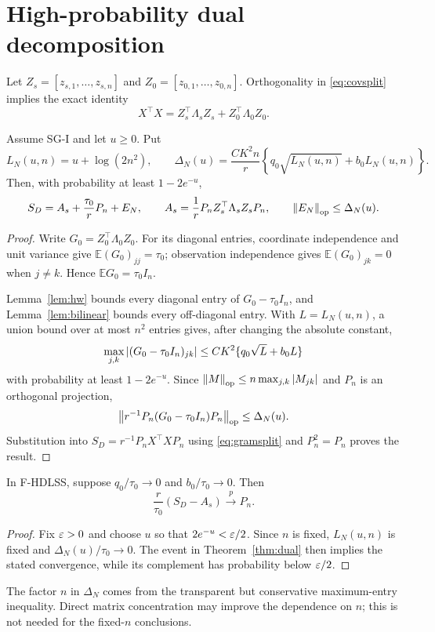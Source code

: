 \section{High-probability dual decomposition}\label{sec:dual}
Let $Z_s=[z_{s,1},\ldots,z_{s,n}]$ and $Z_0=[z_{0,1},\ldots,z_{0,n}]$.  Orthogonality in \eqref{eq:covsplit} implies the exact identity
\begin{equation}\label{eq:gramsplit}
X^\top X=Z_s^\top\Lambda_sZ_s+Z_0^\top\Lambda_0Z_0.
\end{equation}
\begin{theorem}\label{thm:dual}
Assume SG-I and let $u\ge0$.  Put
\begin{equation}
L_N(u,n)=u+\log(2n^2),\qquad
\Delta_N(u)=\frac{CK^2n}{r}\left\{q_0\sqrt{L_N(u,n)}+b_0L_N(u,n)\right\}.
\end{equation}
Then, with probability at least $1-2e^{-u}$,
\begin{equation}\label{eq:dualdecomp}
S_D=A_s+\frac{\tau_0}{r}P_n+E_N,
\qquad A_s=\frac1rP_nZ_s^\top\Lambda_sZ_sP_n,
\qquad \left\lVert E_N\right\rVert_{\mathrm{op}}\le\Delta_N(u).
\end{equation}
\end{theorem}
\begin{proof}
Write $G_0=Z_0^\top\Lambda_0Z_0$.  For its diagonal entries, coordinate independence and unit variance give $\mathbb{E}(G_0)_{jj}=\tau_0$; observation independence gives $\mathbb{E}(G_0)_{jk}=0$ when $j\ne k$.  Hence $\mathbb{E}G_0=\tau_0I_n$.

Lemma~\ref{lem:hw} bounds every diagonal entry of $G_0-\tau_0I_n$, and Lemma~\ref{lem:bilinear} bounds every off-diagonal entry.  With $L=L_N(u,n)$, a union bound over at most $n^2$ entries gives, after changing the absolute constant,
\begin{equation}
\max_{j,k}\left\lvert(G_0-\tau_0I_n)_{jk}\right\rvert
\le CK^2\{q_0\sqrt L+b_0L\}
\end{equation}
with probability at least $1-2e^{-u}$.  Since $\left\lVert M\right\rVert_{\mathrm{op}}\le n\max_{j,k}\left\lvert M_{jk}\right\rvert$ and $P_n$ is an orthogonal projection,
\begin{equation}
\left\lVert r^{-1}P_n(G_0-\tau_0I_n)P_n\right\rVert_{\mathrm{op}}\le\Delta_N(u).
\end{equation}
Substitution into $S_D=r^{-1}P_nX^\top XP_n$ using \eqref{eq:gramsplit} and $P_n^2=P_n$ proves the result.
\end{proof}

\begin{corollary}\label{cor:spherical}
In F-HDLSS, suppose $q_0/\tau_0\to0$ and $b_0/\tau_0\to0$.  Then
\begin{equation}
\frac{r}{\tau_0}(S_D-A_s)\xrightarrow{p}P_n.
\end{equation}
\end{corollary}
\begin{proof}
Fix $\varepsilon>0$ and choose $u$ so that $2e^{-u}<\varepsilon/2$.  Since $n$ is fixed, $L_N(u,n)$ is fixed and $\Delta_N(u)/\tau_0\to0$.  The event in Theorem~\ref{thm:dual} then implies the stated convergence, while its complement has probability below $\varepsilon/2$.
\end{proof}

\begin{remark}
The factor $n$ in $\Delta_N$ comes from the transparent but conservative maximum-entry inequality.  Direct matrix concentration may improve the dependence on $n$; this is not needed for the fixed-$n$ conclusions.
\end{remark}
